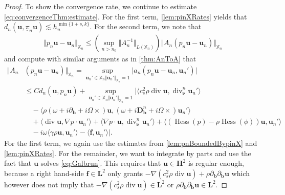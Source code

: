 \documentclass{m2an}
\newcommand{\csr}{c_s^2 \rho}
\newcommand{\nv}{\boldsymbol{\nu}}
\newcommand{\bflow}{\mathbf{b}}
\newcommand{\angvel}{\Omega}
\newcommand{\conv}{\partial_{\bflow}} %
\newcommand{\opd}{(\omega+i\conv+i\angvel\times)}
\newcommand{\dopd}{(\omega+i\ddiffb+i\angvel\times)}
\renewcommand{\u}{\mathbf{u}}
\renewcommand{\div}{\operatorname{div}}
\DeclareMathOperator{\hess}{Hess}
\newcommand{\Xn}{\mathbb{X}_n}
\newcommand{\bH}{{\mathbf H}}
\newcommand{\bD}{\mathbf{D}}
\newcommand{\bL}{\mathbf{L}}
\newcommand{\bff}{\mathbf{f}}
\newcommand{\spl}{\langle}
\newcommand{\spr}{\rangle}
\newcommand{\diffb}{\partial_{\bflow}}
\newcommand{\ddiffb}{\bD_{\bflow}^n}
\newcommand{\ddiv}{\div_{\nv}^n}
\newcommand{\pinX}{\underline{\pi}_n}
\theoremstyle{plain}
\theoremstyle{definition}
\begin{document}
\begin{proof}
   To show the convergence rate, we continue to estimate \eqref{eq:convergenceThm:estimate}. For the first term,  \cref{lem:pinXRates} yields that $d_n(\u,\pinX \u) \lesssim h_n^{\min\{1+s,k\}}$. For the second term, we note that
   \begin{align*}
     \Vert p_n \u - \u_n \Vert_{\Xn} \le ( \sup_{n > n_0} \Vert A_n^{-1}  \Vert_{L(\Xn)}) \Vert A_n(p_n \u - \u_n) \Vert_{\Xn}
   \end{align*}
   and compute with similar arguments as in \cref{thm:AnToA} that 
   \begin{align*}
      \Vert A_n &(p_n \u - \u_n) \Vert_{\Xn} = \sup_{\u_n' \in \Xn  \Vert \u_n' \Vert_{\Xn} = 1} \vert a_n(p_n \u -  \u_n, \u_n') \vert \\
      &\le C d_n(\u,p_n \u) + \sup_{\u_n' \in \Xn  \Vert \u_n' \Vert_{\Xn} = 1} \vert \spl c_s^2 \rho \div \u, \ddiv \u_n' \spr \\
      &\quad - \spl \rho \opd \u, \dopd \u_n' \spr \\
      &\quad + \spl \div \u, \nabla p \cdot \u_n' \spr + \spl \nabla p \cdot \u, \ddiv \u_n' \spr + \spl (\hess(p) - \rho \hess(\phi)) \u, \u_n' \spr \\
      &\quad - i \omega \spl \gamma \rho \u, \u_n' \spr - \spl \bff, \u_n' \spr \vert. 
   \end{align*}
   For the first term, we again use the estimates from \cref{lem:pnBoundedBypinX} and \cref{lem:pinXRates}. For the remainder, we want to integrate by parts and use the fact that $\u$ solves \eqref{eq:Galbrun}. This requires that $\u \in \bH^2$ is regular enough, because a right hand-side $\bff \in \bL^2$ only grants $-\nabla(\csr \div \u) + \rho \diffb \diffb \u$ which however does not imply that $-\nabla(\csr \div \u) \in \bL^2$ or $\rho \diffb \diffb \u \in \bL^2$.
   

\end{proof}
\end{document}
